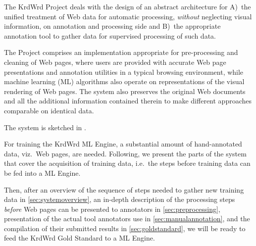 \begin{longversion}
The KrdWrd Project\cite{krdwrd.org} deals with the design of an abstract architecture for 
A)~the unified treatment of Web data for automatic processing, \emph{without} neglecting visual information, on annotation and processing side and 
B)~the appropriate annotation tool to gather data for supervised processing of such data.

The Project comprises an implementation appropriate for pre-processing and cleaning of Web pages, where users are provided with accurate Web page presentations and annotation utilities in a typical browsing environment, while machine learning (ML) algorithms also operate on representations of the visual rendering of Web pages.
The system also preserves the original Web documents and all the additional information contained therein to make different approaches comparable on identical data.

The system is sketched in \cite{StegerStemle2009}.

For training the KrdWrd ML Engine, a substantial amount of hand-annotated data, viz.~Web pages, are needed. 
Following, we present the parts of the system that cover the acquisition of training data, i.e.~the steps before training data can be fed into a ML Engine. 

Then, after an overview of the sequence of steps needed to gather new training data in \ref{sec:systemoverview}, an in-depth description of the processing steps \emph{before} Web pages can be presented to annotators in \ref{sec:preprocessing}, presentation of the actual tool annotators use in \ref{sec:manualannotation}, and the compilation of their submitted results in \ref{sec:goldstandard}, we will be ready to feed the KrdWrd Gold Standard to a ML Engine.
\end{longversion}
